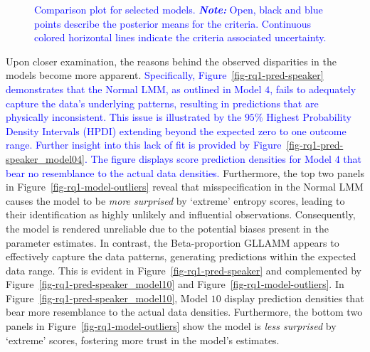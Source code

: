 \documentclass[
  authoryear,
  preprint,
  1p]{elsarticle}
\begin{document}
\label{cell-fig-rq1-waic-psis}
\begin{figure}[H]


\caption{\label{fig-rq1-waic-psis}\textcolor{blue}{Comparison plot for selected models.
\textbf{\emph{Note:}} Open, black and blue points describe the posterior
means for the criteria. Continuous colored horizontal lines indicate the
criteria associated uncertainty.}}

\end{figure}%

Upon closer examination, the reasons behind the observed disparities in
the models become more apparent. \textcolor{blue}{Specifically,
Figure~\ref{fig-rq1-pred-speaker} demonstrates that the Normal LMM, as
outlined in Model \(4\), fails to adequately capture the data's
underlying patterns, resulting in predictions that are physically
inconsistent. This issue is illustrated by the \(95\%\) Highest
Probability Density Intervals (HPDI) extending beyond the expected zero
to one outcome range. Further insight into this lack of fit is provided
by Figure~\ref{fig-rq1-pred-speaker_model04}. The figure displays score
prediction densities for Model \(4\) that bear no resemblance to the
actual data densities.} Furthermore, the top two panels in
Figure~\ref{fig-rq1-model-outliers} reveal that misspecification in the
Normal LMM causes the model to be \emph{more surprised} by `extreme'
entropy scores, leading to their identification as highly unlikely and
influential observations. Consequently, the model is rendered unreliable
due to the potential biases present in the parameter estimates. In
contrast, the Beta-proportion GLLAMM appears to effectively capture the
data patterns, generating predictions within the expected data range.
This is evident in Figure~\ref{fig-rq1-pred-speaker} and complemented by
Figure~\ref{fig-rq1-pred-speaker_model10} and
Figure~\ref{fig-rq1-model-outliers}. In
Figure~\ref{fig-rq1-pred-speaker_model10}, Model \(10\) display
prediction densities that bear more resemblance to the actual data
densities. Furthermore, the bottom two panels in
Figure~\ref{fig-rq1-model-outliers} show the model is \emph{less
surprised} by `extreme' scores, fostering more trust in the model's
estimates.
\end{document}
